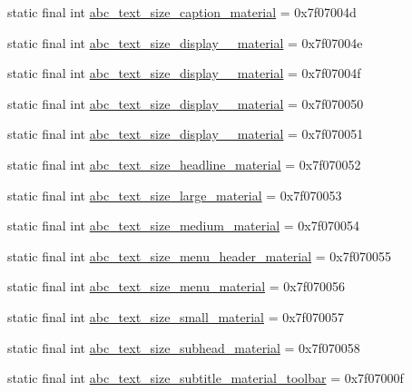 \begin{CompactItemize}
\item 
static final int \hyperlink{classandroid_1_1support_1_1v4_1_1_r_1_1dimen_1fa35c0b73ab9067fcd1c6906c35022a}{abc\_\-text\_\-size\_\-caption\_\-material} = 0x7f07004d
\item 
static final int \hyperlink{classandroid_1_1support_1_1v4_1_1_r_1_1dimen_c3c3ad43452424db2d92f67dbbdd2519}{abc\_\-text\_\-size\_\-display\_\_\-material} = 0x7f07004e
\item 
static final int \hyperlink{classandroid_1_1support_1_1v4_1_1_r_1_1dimen_e3bc64e02c9b1fe170cf8b497e92579d}{abc\_\-text\_\-size\_\-display\_\_\-material} = 0x7f07004f
\item 
static final int \hyperlink{classandroid_1_1support_1_1v4_1_1_r_1_1dimen_86ca805fe706ddc8719393ec5021a368}{abc\_\-text\_\-size\_\-display\_\_\-material} = 0x7f070050
\item 
static final int \hyperlink{classandroid_1_1support_1_1v4_1_1_r_1_1dimen_6b9e23676aa7488a617b11ca71036c49}{abc\_\-text\_\-size\_\-display\_\_\-material} = 0x7f070051
\item 
static final int \hyperlink{classandroid_1_1support_1_1v4_1_1_r_1_1dimen_f0f0f32614ecfd734dc83105ba2ae331}{abc\_\-text\_\-size\_\-headline\_\-material} = 0x7f070052
\item 
static final int \hyperlink{classandroid_1_1support_1_1v4_1_1_r_1_1dimen_9c2eced4526f77f908c0c309364a8870}{abc\_\-text\_\-size\_\-large\_\-material} = 0x7f070053
\item 
static final int \hyperlink{classandroid_1_1support_1_1v4_1_1_r_1_1dimen_ab04b973701ed825d5aae240bdb2ed05}{abc\_\-text\_\-size\_\-medium\_\-material} = 0x7f070054
\item 
static final int \hyperlink{classandroid_1_1support_1_1v4_1_1_r_1_1dimen_33efc5de6c81f231284103b92ce66b44}{abc\_\-text\_\-size\_\-menu\_\-header\_\-material} = 0x7f070055
\item 
static final int \hyperlink{classandroid_1_1support_1_1v4_1_1_r_1_1dimen_dad07895084b6e9d0f802d01624fbd6e}{abc\_\-text\_\-size\_\-menu\_\-material} = 0x7f070056
\item 
static final int \hyperlink{classandroid_1_1support_1_1v4_1_1_r_1_1dimen_84c85db304b8e6e1a8e80d60401a4f52}{abc\_\-text\_\-size\_\-small\_\-material} = 0x7f070057
\item 
static final int \hyperlink{classandroid_1_1support_1_1v4_1_1_r_1_1dimen_e637bc45ae206b3535ff009e40344bba}{abc\_\-text\_\-size\_\-subhead\_\-material} = 0x7f070058
\item 
static final int \hyperlink{classandroid_1_1support_1_1v4_1_1_r_1_1dimen_d87735fce8b04b26de5af58e6f3ee103}{abc\_\-text\_\-size\_\-subtitle\_\-material\_\-toolbar} = 0x7f07000f

\end{CompactItemize}
